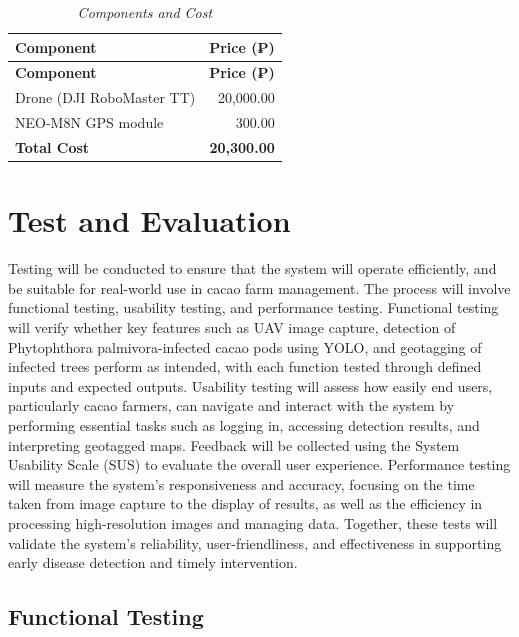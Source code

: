 \begin{longtable}{p{8cm} r}
	\caption{\textit{Components and Cost}} \label{tab:components} \\

	\toprule
	\textbf{Component}        & \textbf{Price (₱)}                \\
	\midrule
	\endfirsthead

	\toprule
	\textbf{Component}        & \textbf{Price (₱)}                \\
	\midrule
	\endhead

	\bottomrule
	\endfoot

	Drone (DJI RoboMaster TT) & 20,000.00                         \\
	NEO-M8N GPS module        & 300.00                            \\
	\midrule
	\textbf{Total Cost}       & \textbf{20,300.00}                \\
\end{longtable}


\section{Test and Evaluation}

Testing will be conducted to ensure that the system will operate efficiently, and be suitable for real-world use in cacao farm management. The process will involve functional testing, usability testing, and performance testing. Functional testing will verify whether key features such as UAV image capture, detection of Phytophthora palmivora-infected cacao pods using YOLO, and geotagging of infected trees perform as intended, with each function tested through defined inputs and expected outputs. Usability testing will assess how easily end users, particularly cacao farmers, can navigate and interact with the system by performing essential tasks such as logging in, accessing detection results, and interpreting geotagged maps. Feedback will be collected using the System Usability Scale (SUS) to evaluate the overall user experience. Performance testing will measure the system’s responsiveness and accuracy, focusing on the time taken from image capture to the display of results, as well as the efficiency in processing high-resolution images and managing data. Together, these tests will validate the system’s reliability, user-friendliness, and effectiveness in supporting early disease detection and timely intervention.

\subsection{Functional Testing}


